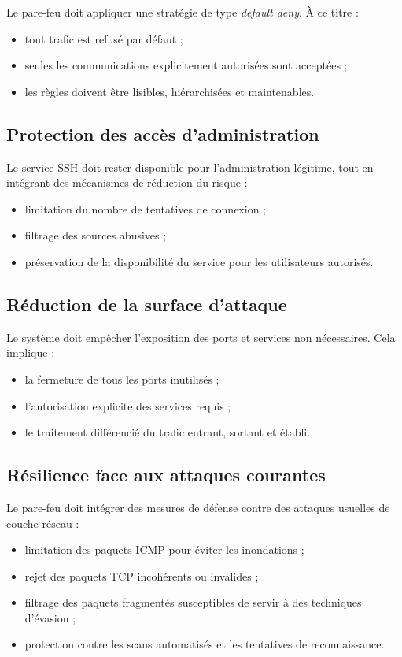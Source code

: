 Le pare-feu doit appliquer une stratégie de type \emph{default deny}. À ce titre :
\begin{itemize}
    \item tout trafic est refusé par défaut ;
    \item seules les communications explicitement autorisées sont acceptées ;
    \item les règles doivent être lisibles, hiérarchisées et maintenables.
\end{itemize}

\subsection{Protection des accès d'administration}

Le service SSH doit rester disponible pour l'administration légitime, tout en intégrant des mécanismes de réduction du risque :
\begin{itemize}
    \item limitation du nombre de tentatives de connexion ;
    \item filtrage des sources abusives ;
    \item préservation de la disponibilité du service pour les utilisateurs autorisés.
\end{itemize}

\subsection{Réduction de la surface d'attaque}

Le système doit empêcher l'exposition des ports et services non nécessaires. Cela implique :
\begin{itemize}
    \item la fermeture de tous les ports inutilisés ;
    \item l'autorisation explicite des services requis ;
    \item le traitement différencié du trafic entrant, sortant et établi.
\end{itemize}

\subsection{Résilience face aux attaques courantes}

Le pare-feu doit intégrer des mesures de défense contre des attaques usuelles de couche réseau :
\begin{itemize}
    \item limitation des paquets ICMP pour éviter les inondations ;
    \item rejet des paquets TCP incohérents ou invalides ;
    \item filtrage des paquets fragmentés susceptibles de servir à des techniques d'évasion ;
    \item protection contre les scans automatisés et les tentatives de reconnaissance.
\end{itemize}

